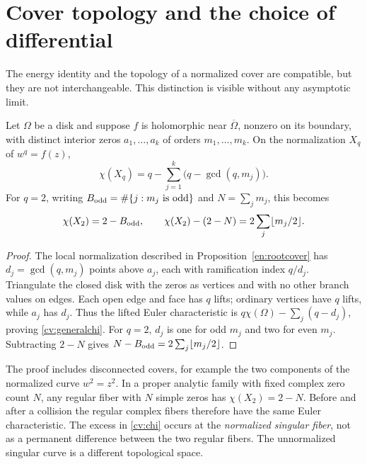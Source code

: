 \section{Cover topology and the choice of differential}
\label{cv:section}

The energy identity and the topology of a normalized cover are compatible,
but they are not interchangeable. This distinction is visible without
any asymptotic limit.

\begin{proposition}
\label{cv:euler}
Let $\Omega$ be a disk and suppose $f$ is holomorphic near
$\overline\Omega$, nonzero on its boundary, with distinct interior zeros
$a_1,\ldots,a_k$ of orders $m_1,\ldots,m_k$. On the normalization $X_q$
of $w^q=f(z)$,
\begin{equation}\label{cv:generalchi}
 \chi(X_q)=q-\sum_{j=1}^k\bigl(q-\gcd(q,m_j)\bigr).
\end{equation}
For $q=2$, writing $B_{\rm odd}=\#\{j:m_j\text{ is odd}\}$ and
$N=\sum_jm_j$, this becomes
\begin{equation}\label{cv:chi}
 \chi(X_2)=2-B_{\rm odd},\qquad
 \chi(X_2)-(2-N)=2\sum_j\lfloor m_j/2\rfloor.
\end{equation}
\end{proposition}
\begin{proof}
The local normalization described in Proposition~\ref{en:rootcover}
has $d_j=\gcd(q,m_j)$ points above $a_j$, each with ramification index
$q/d_j$. Triangulate the closed disk with the zeros as vertices and with
no other branch values on edges. Each open edge and face has $q$ lifts;
ordinary vertices have $q$ lifts, while $a_j$ has $d_j$. Thus the lifted
Euler characteristic is $q\chi(\Omega)-\sum_j(q-d_j)$, proving
\eqref{cv:generalchi}. For $q=2$, $d_j$ is one for odd $m_j$ and two
for even $m_j$. Subtracting $2-N$ gives
$N-B_{\rm odd}=2\sum_j\lfloor m_j/2\rfloor$.
\end{proof}

The proof includes disconnected covers, for example the two components
of the normalized curve $w^2=z^2$. In a proper analytic family with fixed
complex zero count $N$, any regular fiber with $N$ simple zeros has
$\chi(X_2)=2-N$. Before and after a collision the regular complex fibers
therefore have the same Euler characteristic. The excess in
\eqref{cv:chi} occurs at the \emph{normalized singular fiber}, not as a
permanent difference between the two regular fibers. The unnormalized
singular curve is a different topological space.


